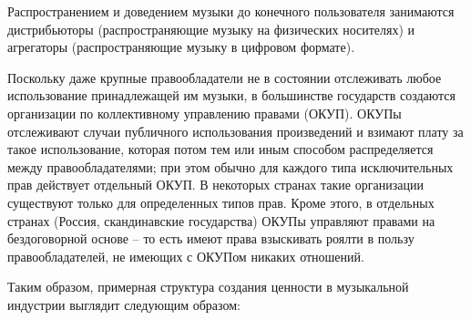 \documentclass[12pt]{report}
\begin{document}
\begin{multicols}{2}
Распространением и доведением музыки до конечного пользователя занимаются дистрибьюторы (распространяющие музыку на физических носителях) и агрегаторы (распространяющие музыку в цифровом формате).

Поскольку даже крупные правообладатели не в состоянии отслеживать любое использование принадлежащей им музыки, в большинстве государств создаются организации по коллективному управлению правами (ОКУП). ОКУПы отслеживают случаи публичного использования произведений и взимают плату за такое использование, которая потом тем или иным способом распределяется между правообладателями; при этом обычно для каждого типа исключительных прав действует отдельный ОКУП. В некоторых странах такие организации существуют только для определенных типов прав. Кроме этого, в отдельных странах (Россия, скандинавские государства) ОКУПы управляют правами на бездоговорной основе – то есть имеют права взыскивать роялти в пользу правообладателей, не имеющих с ОКУПом никаких отношений.

Таким образом, примерная структура создания ценности в музыкальной индустрии выглядит следующим образом:

\end{multicols}
\end{document}
